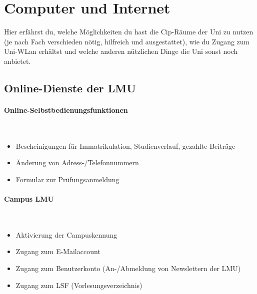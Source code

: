 ﻿\section{Computer und Internet}

Hier erfährst du, welche Möglichkeiten du hast die Cip-Räume der Uni zu nutzen (je nach
Fach verschieden nötig, hilfreich und ausgestattet), wie du Zugang zum Uni-WLan erhältst 
und welche anderen nützlichen Dinge die Uni sonst noch anbietet.

\subsection{Online-Dienste der LMU}
\paragraph{Online-Selbstbedienungsfunktionen}\hfill\\
\begin{itemize}
	\item Bescheinigungen für Immatrikulation, Studienverlauf, gezahlte Beiträge
	\item Änderung von Adress-/Telefonnummern
	\item Formular zur Prüfungsanmeldung
\end{itemize}
\begin{urlList}
\end{urlList}

\paragraph{Campus LMU}\hfill\\
\begin{itemize}
	\item Aktivierung der Campuskennung
	\item Zugang zum E-Mailaccount
	\item Zugang zum Benutzerkonto (An-/Abmeldung von Newslettern der LMU)
	\item Zugang zum LSF (Vorlesungsverzeichnis)
\end{itemize}
\begin{urlList}
\end{urlList}

